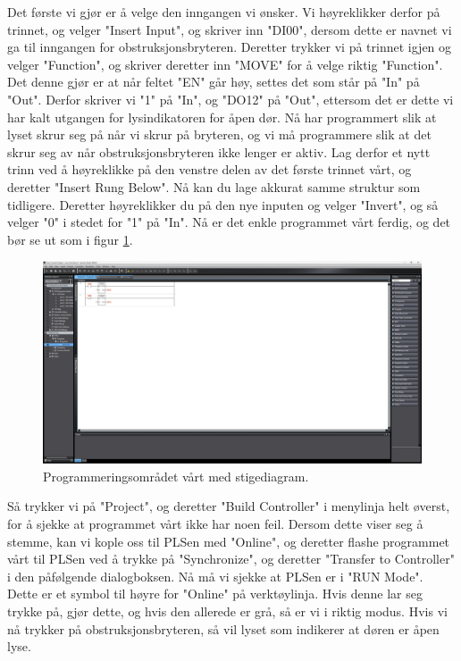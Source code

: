 \begin{alphasection}
Det første vi gjør er å velge den inngangen vi ønsker. Vi høyreklikker derfor på trinnet, og velger "Insert Input", og skriver inn "DI00", dersom dette er navnet vi ga til inngangen for obstruksjonsbryteren. Deretter trykker vi på trinnet igjen og velger "Function", og skriver deretter inn "MOVE" for å velge riktig "Function". Det denne gjør er at når feltet "EN" går høy, settes det som står på "In" på "Out". Derfor skriver vi "1" på "In", og "DO12" på "Out", ettersom det er dette vi har kalt utgangen for lysindikatoren for åpen dør. Nå har programmert slik at lyset skrur seg på når vi skrur på bryteren, og vi må programmere slik at det skrur seg av når obstruksjonsbryteren ikke lenger er aktiv. Lag derfor et nytt trinn ved å høyreklikke på den venstre delen av det første trinnet vårt, og deretter "Insert Rung Below". Nå kan du lage akkurat samme struktur som tidligere. Deretter høyreklikker du på den nye inputen og velger "Invert", og så velger "0" i stedet for "1" på "In". Nå er det enkle programmet vårt ferdig, og det bør se ut som i figur \ref{fig:full_rung}.

\begin{figure}[ht]
    \centering
    \hspace*{-2cm}
    \includegraphics[scale=0.275]{figures/full_rung.png}
    \caption{Programmeringsområdet vårt med stigediagram.}
    \label{fig:full_rung}
\end{figure}

Så trykker vi på "Project", og deretter "Build Controller" i menylinja helt øverst, for å sjekke at programmet vårt ikke har noen feil. Dersom dette viser seg å stemme, kan vi kople oss til PLSen med "Online", og deretter flashe programmet vårt til PLSen ved å trykke på "Synchronize", og deretter "Transfer to Controller" i den påfølgende dialogboksen. Nå må vi sjekke at PLSen er i "RUN Mode". Dette er et symbol til høyre for "Online" på verktøylinja. Hvis denne lar seg trykke på, gjør dette, og hvis den allerede er grå, så er vi i riktig modus. Hvis vi nå trykker på obstruksjonsbryteren, så vil lyset som indikerer at døren er åpen lyse.\\


\end{alphasection}
